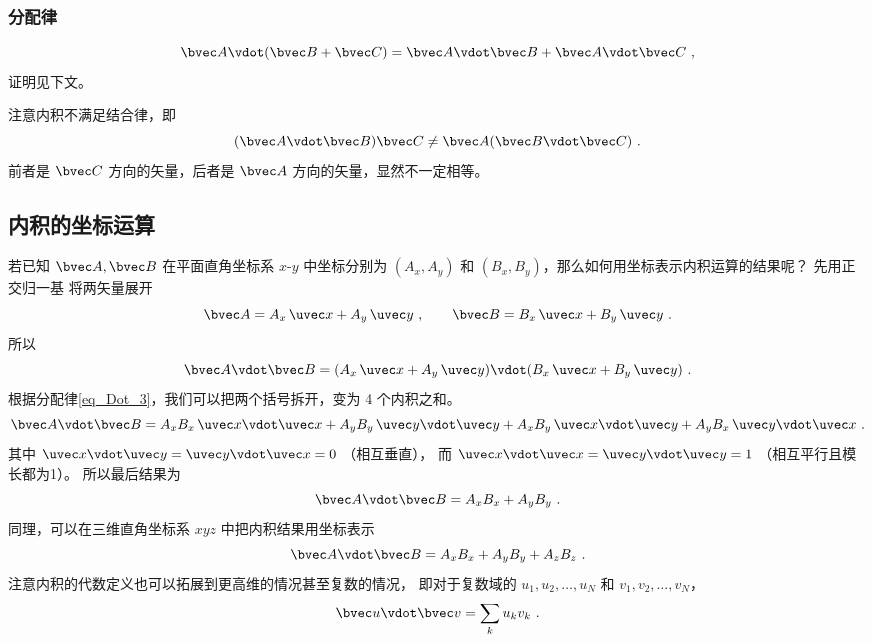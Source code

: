 \subsubsection{分配律}
\begin{equation}\label{eq_Dot_3}
\bvec A \vdot (\bvec B + \bvec C) = \bvec A \vdot \bvec B + \bvec A \vdot \bvec C~,
\end{equation}
证明见下文。

注意内积不满足结合律，即
\begin{equation}
(\bvec A \vdot \bvec B) \bvec C \ne  \bvec A (\bvec B \vdot \bvec C)~.
\end{equation}
前者是 $\bvec C$ 方向的矢量，后者是 $\bvec A$ 方向的矢量，显然不一定相等。

\subsection{内积的坐标运算}
若已知 $\bvec A, \bvec B$ 在平面直角坐标系 $x$-$y$ 中坐标分别为 $(A_x, A_y)$ 和  $(B_x, B_y)$，那么如何用坐标表示内积运算的结果呢？ 先用正交归一基 将两矢量展开 %
\begin{equation}
\bvec A = A_x \,\uvec x + A_y \,\uvec y ~,\qquad \bvec B = B_x \,\uvec x + B_y \,\uvec y~.
\end{equation}
所以
\begin{equation}
\bvec A \vdot \bvec B = (A_x \,\uvec x + A_y \,\uvec y) \vdot (B_x \,\uvec x + B_y \,\uvec y)~.
\end{equation}
根据分配律\autoref{eq_Dot_3}，我们可以把两个括号拆开，变为 4 个内积之和。 
\begin{equation}
\bvec A \vdot \bvec B = A_x B_x \,\uvec x \vdot \uvec x + A_y B_y \,\uvec y \vdot \uvec y + A_x B_y \,\uvec x \vdot \uvec y + A_y B_x \,\uvec y \vdot \uvec x~.
\end{equation}
其中 $\uvec x \vdot \uvec y = \uvec y \vdot \uvec x = 0$ （相互垂直）， 而 $\uvec x \vdot \uvec x = \uvec y \vdot \uvec y = 1$ （相互平行且模长都为1）。 所以最后结果为
\begin{equation}\label{eq_Dot_5}
\bvec A \vdot \bvec B = A_x B_x + A_y B_y~.
\end{equation}
同理，可以在三维直角坐标系 $xyz$ 中把内积结果用坐标表示
\begin{equation}\label{eq_Dot_4}
\bvec A \vdot \bvec B = A_x B_x + A_y B_y + A_z B_z	~.
\end{equation}
注意内积的代数定义也可以拓展到更高维的情况甚至复数的情况， 即对于复数域的 $u_1, u_2, \dots, u_N$ 和 $v_1, v_2, \dots, v_N$，
\begin{equation}
\bvec u \vdot \bvec v = \sum_k u_k v_k~.
\end{equation}

